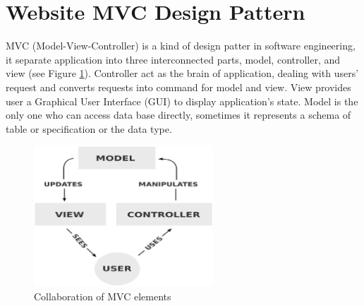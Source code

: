 \section{Website MVC Design Pattern}
MVC (Model-View-Controller) is a kind of design patter in software engineering, it separate application into three interconnected parts, model, controller, and view \cite{Leff2001} (see Figure \ref{fig:mvc}).
Controller act as the brain of application, dealing with users' request and converts requests into command for model and view.
View provides user a Graphical User Interface (GUI) to display application's state.
Model is the only one who can access data base directly, sometimes it represents a schema of table or specification or the data type.

\begin{figure}[H]
    \centering
    \includegraphics[width = 0.6\textwidth]{fig/mvc-relation.eps}
    \caption{Collaboration of MVC elements}
    \label{fig:mvc}
\end{figure}


